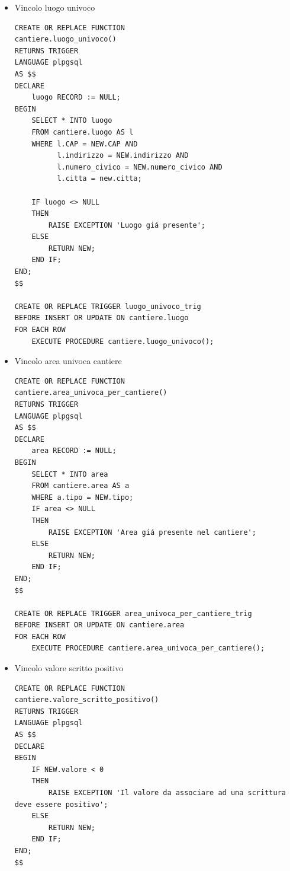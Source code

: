 \documentclass[11pt]{article}
\begin{document}
\begin{itemize}
\begin{verbatim}
CREATE OR REPLACE TRIGGER CAP_composto_solo_da_cifre_trig
BEFORE INSERT OR UPDATE ON cantiere.luogo
FOR EACH ROW
    EXECUTE PROCEDURE cantiere.CAP_composto_solo_da_cifre();
\end{verbatim}
\item Vincolo luogo univoco
\label{sec:orgd0a2622}
\begin{verbatim}
CREATE OR REPLACE FUNCTION
cantiere.luogo_univoco()
RETURNS TRIGGER
LANGUAGE plpgsql
AS $$
DECLARE
    luogo RECORD := NULL;
BEGIN
    SELECT * INTO luogo
    FROM cantiere.luogo AS l
    WHERE l.CAP = NEW.CAP AND
          l.indirizzo = NEW.indirizzo AND
          l.numero_civico = NEW.numero_civico AND
          l.citta = new.citta;

    IF luogo <> NULL
    THEN
        RAISE EXCEPTION 'Luogo giá presente';
    ELSE
        RETURN NEW;
    END IF;
END;
$$

CREATE OR REPLACE TRIGGER luogo_univoco_trig
BEFORE INSERT OR UPDATE ON cantiere.luogo
FOR EACH ROW
    EXECUTE PROCEDURE cantiere.luogo_univoco();
\end{verbatim}
\item Vincolo area univoca cantiere
\label{sec:orgcf7bc4b}
\begin{verbatim}
CREATE OR REPLACE FUNCTION
cantiere.area_univoca_per_cantiere()
RETURNS TRIGGER
LANGUAGE plpgsql
AS $$
DECLARE
    area RECORD := NULL;
BEGIN
    SELECT * INTO area
    FROM cantiere.area AS a
    WHERE a.tipo = NEW.tipo;
    IF area <> NULL
    THEN
        RAISE EXCEPTION 'Area giá presente nel cantiere';
    ELSE
        RETURN NEW;
    END IF;
END;
$$

CREATE OR REPLACE TRIGGER area_univoca_per_cantiere_trig
BEFORE INSERT OR UPDATE ON cantiere.area
FOR EACH ROW
    EXECUTE PROCEDURE cantiere.area_univoca_per_cantiere();
\end{verbatim}
\item Vincolo valore scritto positivo
\label{sec:org187217a}
\begin{verbatim}
CREATE OR REPLACE FUNCTION
cantiere.valore_scritto_positivo()
RETURNS TRIGGER
LANGUAGE plpgsql
AS $$
DECLARE
BEGIN
    IF NEW.valore < 0
    THEN
        RAISE EXCEPTION 'Il valore da associare ad una scrittura deve essere positivo';
    ELSE
        RETURN NEW;
    END IF;
END;
$$


\end{verbatim}
\end{itemize}
\end{document}
